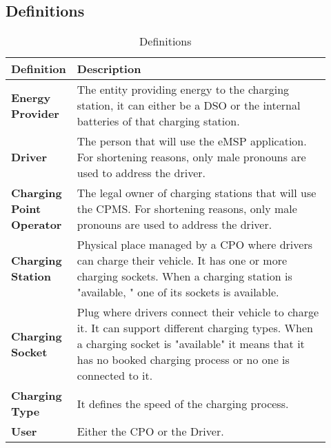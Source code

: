 \subsection{Definitions} %
\label{subsec:definitions}
\begin{table}[H]
\centering 
    \begin{tabular}{| p{0.125\linewidth} | p{0.80\linewidth} |}
    \hline
    \rowcolor{bluepoli!40}
     \textbf{Definition} & \textbf{Description} \T\B \\
    \hline \hline
    \textbf{Energy Provider} & The entity providing energy to the charging station, it can either be a DSO or the internal batteries of that charging station.\T\B\\
    \hline
    \textbf{Driver} & The person that will use the eMSP application. For shortening reasons, only male pronouns are used to address the driver. \T\B\\
    \hline
    \textbf{Charging Point Operator} & The legal owner of charging stations that will use the CPMS. For shortening reasons, only male pronouns are used to address the driver. \T\B\\
    \hline
    \textbf{Charging Station} & Physical place managed by a CPO where drivers can charge their vehicle. It has one or more charging sockets. When a charging station is "available, " one of its sockets is available. \T\B\\
    \hline
    \textbf{Charging Socket} & Plug where drivers connect their vehicle to charge it. It can support different charging types. When a charging socket is "available" it means that it has no booked charging process  or no one is connected to it.\T\B\\
    \hline
    \textbf{Charging Type} & It defines the speed of the charging process.\T\B\\
    \hline
    \textbf{User} & Either the CPO or the Driver.\T\B\\
    \hline
    
    \end{tabular}
    \\[10pt]
    \caption{Definitions}
\end{table}

